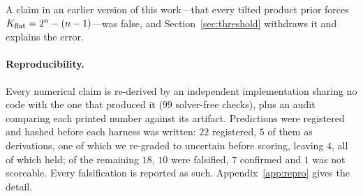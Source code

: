\noindent A claim in an earlier version of this work---that every tilted product
prior forces $K_{\mathrm{flat}} = 2^n - (n-1)$---was false, and
Section~\ref{sec:threshold} withdraws it and explains the error.

\paragraph{Reproducibility.}
Every numerical claim is re-derived by an independent implementation sharing no
code with the one that produced it ($99$ solver-free checks), plus an audit
comparing each printed number against its artifact. Predictions were registered
and hashed before each harness was written: $22$ registered, $5$ of them as
derivations, one of which we re-graded to uncertain before scoring, leaving $4$,
all of which held; of the remaining $18$, $10$ were falsified, $7$ confirmed and
$1$ was not scoreable. Every falsification is reported as such.
Appendix~\ref{app:repro} gives the detail.

